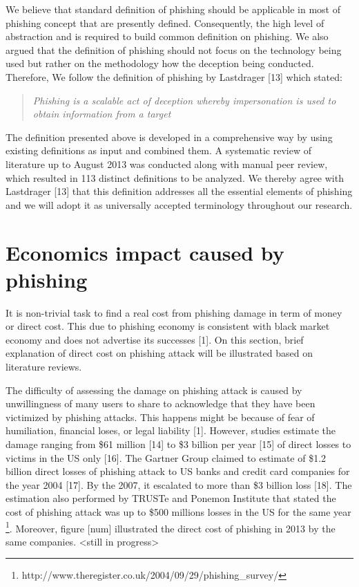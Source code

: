 We believe that standard definition of phishing should be applicable
in most of phishing concept that are presently defined. Consequently,
the high level of abstraction and is required to build common definition
on phishing. We also argued that the definition of phishing should
not focus on the technology being used but rather on the methodology
how the deception being conducted. Therefore, We follow the definition
of phishing by Lastdrager {[}13{]} which stated: 
\begin{quote}
\textit{Phishing is a scalable act of deception whereby impersonation
is used to obtain information from a target}
\end{quote}
The definition presented above is developed in a comprehensive way
by using existing definitions as input and combined them. A systematic
review of literature up to August 2013 was conducted along with manual
peer review, which resulted in 113 distinct definitions to be analyzed.
We thereby agree with Lastdrager {[}13{]} that this definition addresses
all the essential elements of phishing and we will adopt it as universally
accepted terminology throughout our research.


\section{Economics impact caused by phishing}

It is non-trivial task to find a real cost from phishing damage in
term of money or direct cost. This due to phishing economy is consistent
with black market economy and does not advertise its successes {[}1{]}.
On this section, brief explanation of direct cost on phishing attack
will be illustrated based on literature reviews.

The difficulty of assessing the damage on phishing attack is caused
by unwillingness of many users to share to acknowledge that they have
been victimized by phishing attacks. This happens might be because
of fear of humiliation, financial loses, or legal liability {[}1{]}.
However, studies estimate the damage ranging from \$61 million {[}14{]}
to \$3 billion per year {[}15{]} of direct losses to victims in the
US only {[}16{]}. The Gartner Group claimed to estimate of \$1.2 billion
direct losses of phishing attack to US banks and credit card companies
for the year 2004 {[}17{]}. By the 2007, it escalated to more than
\$3 billion loss {[}18{]}. The estimation also performed by TRUSTe
and Ponemon Institute that stated the cost of phishing attack was
up to \$500 millions losses in the US for the same year %
\footnote{http://www.theregister.co.uk/2004/09/29/phishing\_survey/%
}. Moreover, figure {[}num{]} illustrated the direct cost of phishing
in 2013 by the same companies. <still in progress> 


